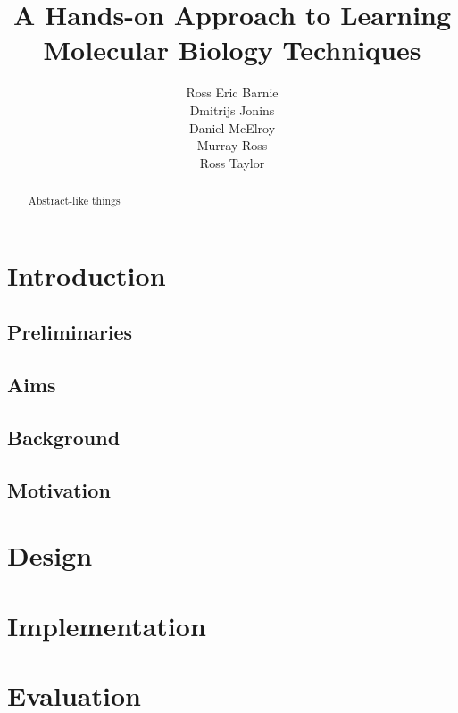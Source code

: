 \documentclass{l3proj}
\title{A Hands-on Approach to Learning Molecular Biology Techniques}
\author{
  Ross Eric Barnie \\
  Dmitrijs Jonins \\
  Daniel McElroy \\
  Murray Ross \\
  Ross Taylor
}
\date{}
\begin{document}
\maketitle
\begin{abstract}

Abstract-like things

\end{abstract}
\educationalconsent
\tableofcontents

\chapter{Introduction}
\label{intro}

\section{Preliminaries}


\section{Aims}


\section{Background}

\section{Motivation}


\chapter{Design}
\label{design}

\chapter{Implementation}
\label{impl}

\chapter{Evaluation}
\label{eval}
\end{document}
